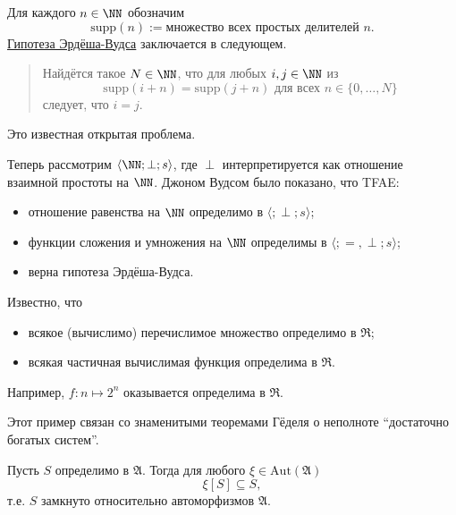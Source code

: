 \documentclass[12pt,a4paper]{article}
\newcommand{\Aut}{\ensuremath{\mathrm{Aut}}\xspace}
\newcommand{\supp}{\ensuremath{\mathrm{supp}}\xspace}
\begin{document}
    \begin{example}
        Для каждого $n \in \NN$ обозначим
        \[\supp(n) := \text{множество всех простых делителей $n$}.\]
        \href{https://en.wikipedia.org/wiki/Erd\%C5\%91s\%E2\%80\%93Woods_number}{Гипотеза Эрдёша-Вудса} заключается в следующем.
        \begin{quotation}
            Найдётся такое $N \in \NN$, что для любых $i, j \in \NN$ из
            \[\supp(i+n) = \supp(j+n) \text{ для всех } n \in \{0, \dots, N\}\]
            следует, что $i = j$.
        \end{quotation}
        Это известная открытая проблема.

        Теперь рассмотрим $\langle \NN; \perp; s \rangle$, где $\perp$ интерпретируется как отношение взаимной простоты на $\NN$. Джоном Вудсом было показано, что TFAE:
        \begin{itemize}
            \item отношение равенства на $\NN$ определимо в $\langle; \perp; s \rangle$;
            \item функции сложения и умножения на $\NN$ определимы в $\langle; {=}, \perp; s \rangle$;
            \item верна гипотеза Эрдёша-Вудса.
        \end{itemize}
    \end{example}

    \begin{example}
        Известно, что
        \begin{itemize}
            \item всякое (вычислимо) перечислимое множество определимо в \hyperlink{R-structure-definition}{$\mathfrak{R}$};
            \item всякая частичная вычислимая функция определима в $\mathfrak{R}$.
        \end{itemize}
        Например, $f: n \mapsto 2^n$ оказывается определима в $\mathfrak{R}$.

        Этот пример связан со знаменитыми теоремами Гёделя о неполноте ``достаточно богатых систем''.
    \end{example}

    \begin{theorem}
        Пусть $S$ определимо в $\mathfrak{A}$. Тогда для любого $\xi \in \Aut(\mathfrak{A})$
        \[\xi[S] \subseteq S,\]
        т.е. $S$ замкнуто относительно автоморфизмов $\mathfrak{A}$.
    \end{theorem}
\end{document}
